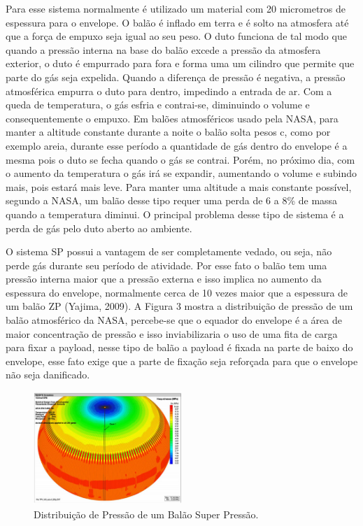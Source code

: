 	Para esse sistema normalmente é utilizado um material com 20 micrometros de espessura para o envelope. O balão é inflado em terra e é solto na atmosfera até que a força de empuxo seja igual ao seu peso. O duto funciona de tal modo que quando a pressão interna na base do balão excede a pressão da atmosfera exterior, o duto é empurrado para fora e forma uma um cilindro que permite que parte do gás seja expelida. Quando a diferença de pressão é negativa, a pressão atmosférica empurra o duto para dentro, impedindo a entrada de ar. Com a queda de temperatura, o gás esfria e contrai-se, diminuindo o volume e consequentemente o empuxo. Em balões atmosféricos usado pela NASA, para manter a altitude constante durante a noite o balão solta pesos c, como por exemplo areia, durante esse período a quantidade de gás dentro do envelope é a mesma pois o duto se fecha quando o gás se contrai. Porém, no próximo dia, com o aumento da temperatura o gás irá se expandir, aumentando o volume e subindo mais, pois estará mais leve. Para manter uma altitude a mais constante possível, segundo a NASA, um balão desse tipo requer uma perda de 6 a 8\% de massa quando a temperatura diminui. O principal problema desse tipo de sistema é a perda de gás pelo duto aberto ao ambiente.

	O sistema SP possui a vantagem de ser completamente vedado, ou seja, não perde gás durante seu período de atividade. Por esse fato o balão tem uma pressão interna maior que a pressão externa e isso implica no aumento da espessura do envelope, normalmente cerca de 10 vezes maior que a espessura de um balão ZP (Yajima, 2009). A Figura 3 mostra a distribuição de pressão de um balão atmosférico da NASA, percebe-se que o equador do envelope é a área de maior concentração de pressão e isso inviabilizaria o uso de uma fita de carga para fixar a payload, nesse tipo de balão a payload é fixada na parte de baixo do envelope, esse fato exige que a parte de fixação seja reforçada para que o envelope não seja danificado.

	\begin{figure}[H]
		\centering
		\includegraphics[width=0.5\textwidth]{figuras/distribuicaoPressao}
		\caption{Distribuição de Pressão de um Balão Super Pressão.}
		\label{img:distribuicaoPressao}
	\end{figure}

